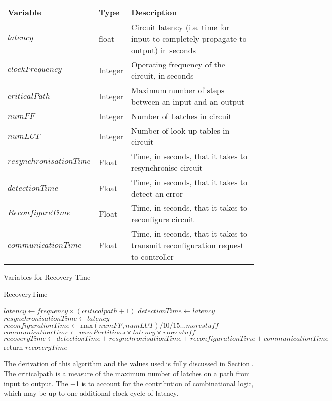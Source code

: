 \documentclass[12pt,final,oneside]{article} %
\begin{document}
\newpage
\begin{algorithm}
   \begin{center}
        \begin{tabularx}{\linewidth}{llX}
        \toprule
        Variable & Type & Description\\
        \midrule
        $latency$ & float & Circuit latency (i.e. time for input to completely propagate to output) in seconds\\
        $clockFrequency$ & Integer & Operating frequency of the circuit, in seconds\\
        $criticalPath$ & Integer & Maximum number of steps between an input and an output\\
        $numFF$ & Integer & Number of Latches in circuit\\
        $numLUT$ & Integer & Number of look up tables in circuit\\
        $resynchronisationTime$ & Float & Time, in seconds, that it takes to resynchronise circuit\\
        $detectionTime$ & Float & Time, in seconds, that it takes to detect an error\\
        $ReconfigureTime$ & Float & Time, in seconds, that it takes to reconfigure circuit\\
        $communicationTime$ & Float & Time, in seconds, that it takes to transmit reconfiguration request to controller\\
        \bottomrule
        \end{tabularx}
        \caption{Variables for Recovery Time}
        \label{varRecoverytime}
    \end{center}
   \caption{RecoveryTime}\label{recoverytime}
   \begin{algorithmic}[1]
            \State $latency \gets frequency\times{}(criticalpath+1)$
            \State $detectionTime \gets latency$
            \State $resynchronisationTime \gets latency$
            \State $reconfigurationTime \gets \mbox{max}(numFF, numLUT)/10/15...more stuff$
            \State $communicationTime \gets numPartitions\times{}latency\times{}more stuff$
            \State $recoveryTime \gets detectionTime+resynchronisationTime+reconfigurationTime+communicationTime$
            \State return $recoveryTime$
         \EndProcedure
   \end{algorithmic}
\end{algorithm}
The derivation of this algorithm and the values used is fully discussed in Section . The criticalpath is a measure of the maximum number of latches on a path from input to output. The +1 is to account for the contribution of combinational logic, which may be up to one additional clock cycle of latency.
\end{document}

